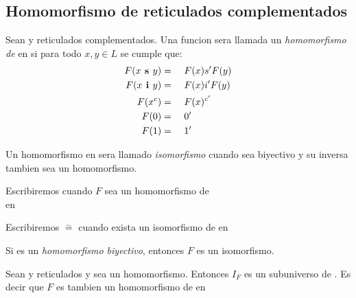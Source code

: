   \subsection{Homomorfismo de reticulados complementados}

  \begin{definition}
    Sean \reticulCompl y  reticulados complementados. Una funcion
     sera llamada un \emph{homomorfismo de} \reticulCompl en 
    si para todo $x, y \in L$ se cumple que:
    \begin{alignat*}{4}
      F(x\textbf{ s }y) &=&\ & F(x) s' F(y)\\
      F(x\textbf{ i }y) &=&\ & F(x) i' F(y)\\
      F(x^c) &=&\ & F(x)^{c'}\\
      F(0) &=&\ & 0'\\
      F(1) &=&\ & 1'
    \end{alignat*}

    Un homomorfismo \reticulCompl en  sera llamado \emph{isomorfismo} cuando
    sea biyectivo y su inversa tambien sea un homomorfismo. 

    Escribiremos  cuando $F$ sea un homomorfismo de\\
    \reticulCompl en 

    Escribiremos \reticulCompl $\overset{\sim}{=}$  cuando exista
    un isomorfismo de \reticulCompl en 
  \end{definition}

  \begin{lemma}
    Si  es un \emph{homomorfismo biyectivo},
    entonces $F$ es un isomorfismo.
  \end{lemma}
  \noproof
  \begin{lemma}
    Sean \reticulCompl y  reticulados y sea 
    un homomorfismo. Entonces $I_F$ es un subuniverso de . Es decir que $F$
    es tambien un homomorfismo de \reticulCompl en 
  \end{lemma}
  \noproof

